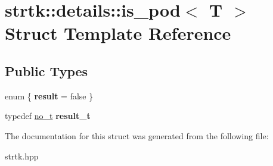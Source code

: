 \hypertarget{structstrtk_1_1details_1_1is__pod}{\section{strtk\-:\-:details\-:\-:is\-\_\-pod$<$ T $>$ Struct Template Reference}
\label{structstrtk_1_1details_1_1is__pod}
}
\subsection*{Public Types}
\begin{DoxyCompactItemize}
\item 
enum \{ {\bfseries result} = false
 \}
\item 
\hypertarget{structstrtk_1_1details_1_1is__pod_ac680d169b20bf14bfb8efb1cd4c76337}{typedef \hyperlink{structstrtk_1_1details_1_1no__t}{no\-\_\-t} {\bfseries result\-\_\-t}}\label{structstrtk_1_1details_1_1is__pod_ac680d169b20bf14bfb8efb1cd4c76337}

\end{DoxyCompactItemize}


The documentation for this struct was generated from the following file\-:\begin{DoxyCompactItemize}
\item 
strtk.\-hpp\end{DoxyCompactItemize}
